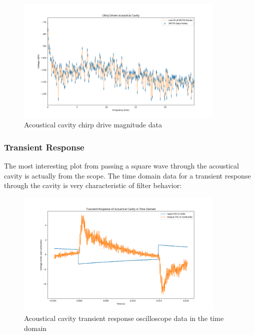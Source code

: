 \documentclass{article}
\begin{document}
\begin{figure}[H]
    \centering
\begin{minipage}{11cm}
\begin{tcolorbox}
    \centering
        \includegraphics[width=10cm, height=6cm]{figures/figure32.png}
        \caption{Acoustical cavity chirp drive magnitude data}
        \label{fig:fig32}
\end{tcolorbox}
\end{minipage}
\end{figure}

\subsubsection{Transient Response}%
\label{ssub:transient_response}

The most interesting plot from passing a square wave through the acoustical
cavity is actually from the scope. The time domain data for a transient
response through the cavity is very characteristic of filter behavior:

\begin{figure}[H]
    \centering
\begin{minipage}{11cm}
\begin{tcolorbox}
    \centering
        \includegraphics[width=10cm, height=6cm]{figures/figure33.png}
        \caption{Acoustical cavity transient response oscilloscope data in the
        time domain}
        \label{fig:fig33}
\end{tcolorbox}
\end{minipage}
\end{figure}
\end{document}
